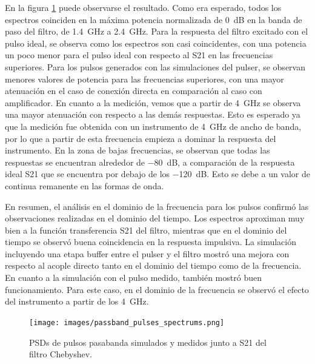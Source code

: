 En la figura \ref{fig:passband_spectrums} puede observarse el resultado. Como
era esperado, todos los espectros coinciden en la máxima potencia normalizada de
\qty{0}{\dB} en la banda de paso del filtro, de \qty{1.4}{\giga\hertz} a
\qty{2.4}{\giga\hertz}. Para la respuesta del filtro excitado con el pulso
ideal, se observa como los espectros son casi coincidentes, con una potencia un
poco menor para el pulso ideal con respecto al S21 en las frecuencias
superiores. Para los pulsos generados con las simulaciones del pulser, se
observan menores valores de potencia para las frecuencias superiores, con una
mayor atenuación en el caso de conexión directa en comparación al caso con
amplificador. En cuanto a la medición, vemos que a partir de
\qty{4}{\giga\hertz} se observa una mayor atenuación con respecto a las demás
respuestas. Esto es esperado ya que la medición fue obtenida con un instrumento
de \qty{4}{\giga\hertz} de ancho de banda, por lo que a partir de esta
frecuencia empieza a dominar la respuesta del instrumento. En la zona de bajas
frecuencias, se observan que todas las respuestas se encuentran alrededor de
\qty{-80}{\dB}, a comparación de la respuesta ideal S21 que se encuentra por
debajo de los \qty{-120}{\dB}. Esto se debe a un valor de continua remanente en
las formas de onda.

En resumen, el análisis en el dominio de la frecuencia para los pulsos confirmó
las observaciones realizadas en el dominio del tiempo. Los espectros aproximan
muy bien a la función transferencia S21 del filtro, mientras que en el dominio
del tiempo se observó buena coincidencia en la respuesta impulsiva. La
simulación incluyendo una etapa buffer entre el pulser y el filtro mostró una
mejora con respecto al acople directo tanto en el dominio del tiempo como de la
frecuencia. En cuanto a la simulación con el pulso medido, también mostró buen
funcionamiento. Para este caso, en el dominio de la frecuencia se observó el
efecto del instrumento a partir de los \qty{4}{\giga\hertz}.

\begin{figure}[t]
    \centering
    \texttt{[image: images/passband\_pulses\_spectrums.png]}
    \caption{PSDs de pulsos pasabanda simulados y medidos junto a S21 del filtro
    Chebyshev.}
    \label{fig:passband_spectrums}
\end{figure}
